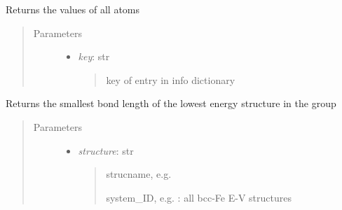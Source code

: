 \documentclass[letterpaper,10pt,english]{sphinxmanual}
\begin{document}
\begin{fulllineitems}
\begin{fulllineitems}
\label{classes:catdata.CATData.get_atoms_info}
Returns the  values of all atoms
\begin{quote}\begin{description}
\item[{Parameters}] \leavevmode\begin{itemize}
\item {} 
\emph{key}: str
\begin{quote}

key of entry in info dictionary
\end{quote}

\end{itemize}

\end{description}\end{quote}

\end{fulllineitems}


\begin{fulllineitems}
\label{classes:catdata.CATData.get_equilibrium_distance}
Returns the smallest bond length of the lowest energy structure
in the group
\begin{quote}\begin{description}
\item[{Parameters}] \leavevmode\begin{itemize}
\item {} 
\emph{structure}: str
\begin{quote}

strucname,  e.g. 

system\_ID, e.g.  : all bcc-Fe E-V structures
\end{quote}

\end{itemize}

\end{description}\end{quote}

\end{fulllineitems}



\end{fulllineitems}
\end{document}
